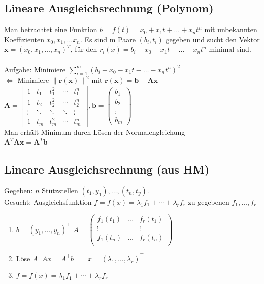 \documentclass[6pt,a4paper]{scrartcl}
\let\olddot = \dot
\newcommand{\norm}[1]{\ensuremath{\|#1\|}}														%
\newcommand{\mat}[1]{\ensuremath{\begin{bmatrix} #1 \end{bmatrix}}}								%
\newcommand{\ma}[1]{\ensuremath{\boldsymbol {#1}}}												%
\newcommand{\vect}[1]{\ensuremath{\begin{pmatrix} #1 \end{pmatrix}}}							%
\newcommand{\svdots}{\ensuremath{\olddot :}}													%
\renewcommand{\vec}[1]{\ensuremath{\boldsymbol {#1}}}											%
\renewcommand*{\dot}[1]{\accentset{\mbox{\textrm{\large\bfseries .}} }{#1}}						%
\begin{document}
\begin{multicols*}{4}
\subsection{Lineare Ausgleichsrechnung (Polynom)}
Man betrachtet eine Funktion $b = f(t) = x_0 + x_1t + \ldots + x_nt^n$ mit unbekannten Koeffizienten $x_0, x_1, \ldots x_n$. Es sind m Paare $(b_i, t_i)$ gegeben und sucht
den Vektor $\vec x = (x_0, x_1, \ldots, x_n)^T$, für den $r_i(x) = b_i - x_0 - x_1t - \ldots - x_nt^n$ minimal sind. \\ \\
\underline{Aufgabe:} Minimiere $\sum\limits_{i = 1}^m (b_i - x_0 - x_1t - \ldots - x_nt^n)^2$ \\
$\Leftrightarrow$ Minimiere $\norm{\vec r(\vec x)}^2$ mit $\vec r(\vec x) = \vec b - \ma A \vec x$ \\
$\ma A = \mat{
	1 & t_1 & t_1^2 & \cdots & t_1^n \\
	1 & t_2 & t_2^2 & \cdots & t_2^n \\
	\vdots & \ddots & \ddots & \ddots & \vdots \\
	1 & t_m & t_m^2 & \cdots & t_m^n
}, \vec b = \vect{b_1 \\ b_2 \\ \svdots \\ b_m}$ \\
Man erhält Minimum durch Lösen der Normalengleichung \\
$\boxed{\ma A^T \ma A \vec x = \ma A^T \vec b}$

\subsection{Lineare Ausgleichsrechnung (aus HM)}
Gegeben: $n$ Stützstellen $(t_1,y_1),\dots,(t_n,t_y)$. \\
Gesucht: Ausgleichsfunktion $f=f(x)=\lambda_1 f_1 +\cdots+\lambda_r f_r$ zu gegebenen $f_1,\dots,f_r$
\begin{enumerate}
	\item $b = (y_1,\dots,y_n)^\top$ \qquad $A=\begin{pmatrix}
	f_1(t_1) & \dots & f_r(t_1) \\
	\vdots & & \vdots \\
	f_1(t_n) & \dots & f_r(t_n) \\
	\end{pmatrix}$
	\item Löse $A^\top Ax=A^\top b \qquad x=(\lambda_1,\dots,\lambda_r)^\top$
	\item $f=f(x)=\lambda_1 f_1 +\cdots+\lambda_r f_r$
\end{enumerate}





\end{multicols*}
\end{document}
